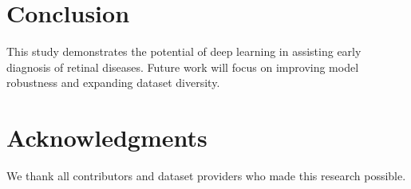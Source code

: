 \documentclass[11pt]{article}
\begin{document}
\section{Conclusion}
This study demonstrates the potential of deep learning in assisting early diagnosis of retinal diseases. Future work will focus on improving model robustness and expanding dataset diversity.

\section*{Acknowledgments}
We thank all contributors and dataset providers who made this research possible.
\end{document}
